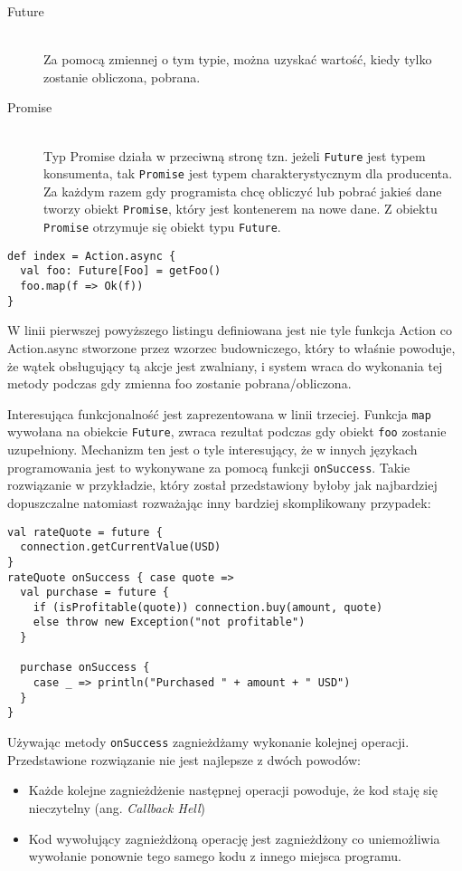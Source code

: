 \begin{description}	
	\item[Future] \hfill \\
		Za pomocą zmiennej o tym typie, można uzyskać wartość, kiedy tylko zostanie obliczona, pobrana.
	\item[Promise] \hfill \\
		Typ Promise działa w przeciwną stronę tzn. jeżeli \lstinline{Future} jest typem konsumenta, tak \lstinline{Promise} jest typem charakterystycznym dla producenta. Za każdym razem gdy programista chcę obliczyć lub pobrać jakieś dane tworzy obiekt \lstinline{Promise}, który jest kontenerem na nowe dane. Z obiektu \lstinline{Promise} otrzymuje się obiekt typu \lstinline{Future}.
\end{description}

\begin{lstlisting}
def index = Action.async {
  val foo: Future[Foo] = getFoo()
  foo.map(f => Ok(f))
}
\end{lstlisting}

\par

W linii pierwszej powyższego listingu definiowana jest nie tyle funkcja Action co Action.async stworzone przez wzorzec budowniczego, który to właśnie powoduje, że wątek obsługujący tą akcje jest zwalniany, i system wraca do wykonania tej metody podczas gdy zmienna foo zostanie pobrana/obliczona.

\par
Interesująca funkcjonalność jest zaprezentowana w linii trzeciej. Funkcja \lstinline{map} wywołana na obiekcie \lstinline{Future}, zwraca rezultat podczas gdy obiekt \lstinline{foo} zostanie uzupełniony. Mechanizm ten jest o tyle interesujący, że w innych językach programowania jest to wykonywane za pomocą funkcji \lstinline{onSuccess}. Takie rozwiązanie w przykładzie, który został przedstawiony byłoby jak najbardziej dopuszczalne natomiast rozważając inny bardziej skomplikowany przypadek:

\begin{lstlisting}
val rateQuote = future {
  connection.getCurrentValue(USD)
}
rateQuote onSuccess { case quote =>
  val purchase = future {
    if (isProfitable(quote)) connection.buy(amount, quote)
    else throw new Exception("not profitable")
  }
  
  purchase onSuccess {
    case _ => println("Purchased " + amount + " USD")
  }
}
\end{lstlisting}

Używając metody \lstinline{onSuccess} zagnieżdżamy wykonanie kolejnej operacji. Przedstawione rozwiązanie nie jest najlepsze z dwóch powodów:
\begin{itemize}
	\item Każde kolejne zagnieżdżenie następnej operacji powoduje, że kod staję się nieczytelny (ang. \emph{Callback Hell})
	\item Kod wywołujący zagnieżdżoną operację jest zagnieżdżony co uniemożliwia wywołanie ponownie tego samego kodu z innego miejsca programu.
\end{itemize}
